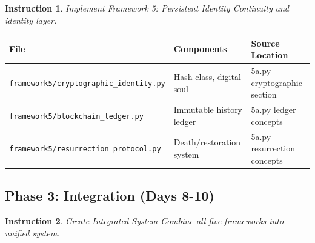 \documentclass[12pt]{article}
\newtheorem{instruction}{Instruction}
\begin{document}
\begin{instruction}{Implement Framework 5: Persistent Identity}
Continuity and identity layer.
\end{instruction}

\begin{longtable}{|p{}|p{}|p{}|}
\hline
\textbf{File} & \textbf{Components} & \textbf{Source Location} \\
\hline
\texttt{framework5/cryptographic\_identity.py} & Hash class, digital soul & 5a.py cryptographic section \\
\hline
\texttt{framework5/blockchain\_ledger.py} & Immutable history ledger & 5a.py ledger concepts \\
\hline
\texttt{framework5/resurrection\_protocol.py} & Death/restoration system & 5a.py resurrection concepts \\
\hline
\end{longtable}

\subsection{Phase 3: Integration (Days 8-10)}

\begin{instruction}{Create Integrated System}
Combine all five frameworks into unified system.
\end{instruction}
\end{document}
